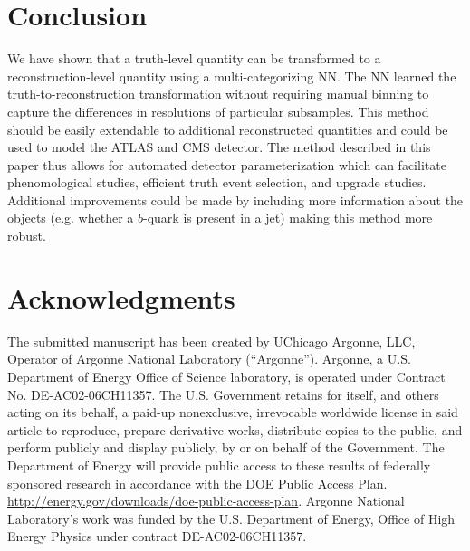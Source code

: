 \documentclass[showpacs,showkeys,preprint,prd,nofootinbib,linenumbers,12pt,superscriptaddress]{revtex4-1}
\begin{document}

\section{Conclusion}

We have shown that a truth-level quantity can be transformed to a reconstruction-level quantity using a multi-categorizing NN. The NN learned the truth-to-reconstruction transformation without requiring manual binning to capture the differences in resolutions of particular subsamples. This method should be easily extendable to additional reconstructed quantities and could be used to model the ATLAS and CMS detector. The method described in this paper thus allows for automated detector parameterization which can facilitate phenomological studies, efficient truth event selection, and upgrade studies. Additional improvements could be made by including more information about the objects (e.g. whether a $b$-quark is present in a jet) making this method more robust. 

\section*{Acknowledgments}
The submitted manuscript has been created by UChicago Argonne, LLC, Operator of Argonne National Laboratory (“Argonne”). Argonne, a U.S.  Department of Energy Office of Science laboratory, is operated under Contract No. DE-AC02-06CH11357. The U.S. Government retains for itself, 
and others acting on its behalf, a paid-up nonexclusive, irrevocable worldwide license in said article to reproduce, prepare derivative works, distribute copies to the public, and perform publicly and display publicly, by or on behalf of the Government.  The Department of Energy will provide public access to these results of federally sponsored research in accordance with the 
DOE Public Access Plan. \url{http://energy.gov/downloads/doe-public-access-plan}. Argonne National Laboratory’s work was funded by the U.S. Department of Energy, Office of High Energy Physics under contract DE-AC02-06CH11357. 



\end{document}
